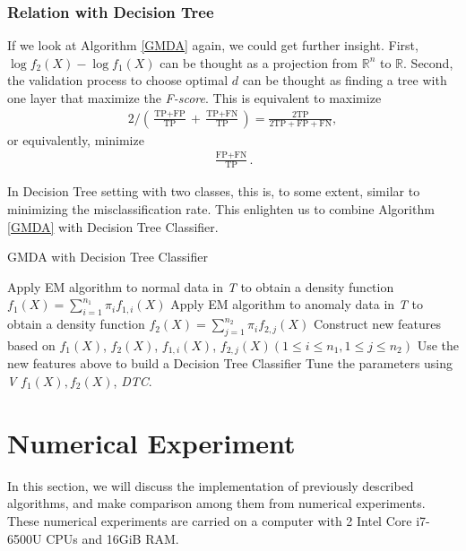 \documentclass[english]{article}
\newenvironment{eqt}{\begin{equation}\begin{aligned}}{\end{aligned}\end{equation}}
\begin{document}
\subsubsection{Relation with Decision Tree}
\par

If we look at Algorithm \ref{GMDA} again, we could get further insight. First, $\log f_2(X) - \log f_1(X)$ can be thought as a projection from $\mathbb{R}^n$ to $\mathbb{R}$. Second, the validation process to choose optimal $d$ can be thought as finding a tree with one layer that maximize the \textit{F-score}. This is equivalent to maximize 
\begin{eqt}
2\bigg/\left(\frac{\text{TP}+\text{FP}}{\text{TP}}+\frac{\text{TP}+\text{FN}}{\text{TP}}\right) = \frac{2\text{TP}}{2\text{TP}+\text{FP}+\text{FN}},
\end{eqt}
or equivalently, minimize
\begin{eqt}
\frac{\text{FP} + \text{FN}}{\text{TP}}.
\end{eqt}
\par
In Decision Tree setting with two classes, this is, to some extent, similar to minimizing the misclassification rate. This enlighten us to combine Algorithm \ref{GMDA} with Decision Tree Classifier.

\begin{algorithm}[H]
\label{GMDA-DTC}
\caption{GMDA with Decision Tree Classifier}
\SetAlgoLined
		Apply EM algorithm to normal data in \textit{T} to obtain a density function $f_1(X) = \sum_{i=1}^{n_1}\pi_if_{1, i}(X)$\;
		Apply EM algorithm to anomaly data in \textit{T} to obtain a density function $f_2(X) = \sum_{j=1}^{n_2}\pi_if_{2, j}(X)$\;
		Construct new features based on $f_1(X)$, $f_2(X)$, $f_{1, i}(X)$, $f_{2, j}(X)$$(1\leqslant i\leqslant n_1, 1\leqslant j\leqslant n_2)$\;
		Use the new features above to build a Decision Tree Classifier\;
		Tune the parameters using \textit{V}\;
		\Return $f_1(X), f_2(X)$, \textit{DTC}.
\end{algorithm}


\section{Numerical Experiment}
\par In this section, we will discuss the implementation of previously described algorithms, and make comparison among them from numerical experiments. These numerical experiments are carried on a computer with 2 Intel Core i7-6500U CPUs and 16GiB RAM.
\end{document}
